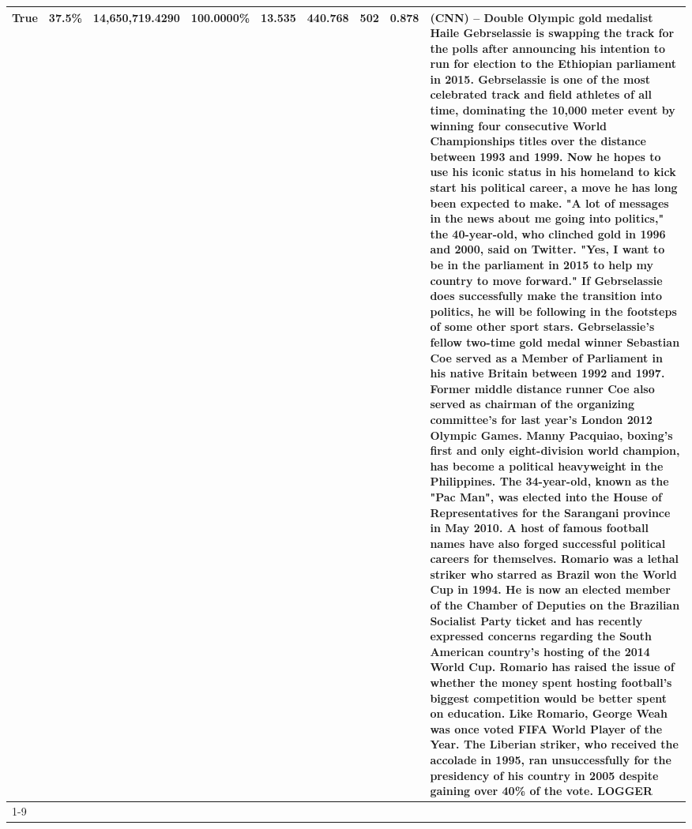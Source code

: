 \begin{table}[H]
{\begin{tabular}{lllrlllll}
True & 37.5\% & 14,650,719.4290 & \bfseries \color{red} 100.0000\% & 13.535 & 440.768 & 502 & 0.878 & (CNN) -- Double Olympic gold medalist Haile Gebrselassie is swapping the track for the polls after announcing his intention to run for election to the Ethiopian parliament in 2015. Gebrselassie is one of the most celebrated track and field athletes of all time, dominating the 10,000 meter event by winning four consecutive World Championships titles over the distance between 1993 and 1999. Now he hopes to use his iconic status in his homeland to kick start his political career, a move he has long been expected to make. "A lot of messages in the news about me going into politics," the 40-year-old, who clinched gold in 1996 and 2000, said on Twitter. "Yes, I want to be in the parliament in 2015 to help my country to move forward." If Gebrselassie does successfully make the transition into politics, he will be following in the footsteps of some other sport stars. Gebrselassie's fellow two-time gold medal winner Sebastian Coe served as a Member of Parliament in his native Britain between 1992 and 1997. Former middle distance runner Coe also served as chairman of the organizing committee's for last year's London 2012 Olympic Games. Manny Pacquiao, boxing's first and only eight-division world champion, has become a political heavyweight in the Philippines. The 34-year-old, known as the "Pac Man", was elected into the House of Representatives for the Sarangani province in May 2010. A host of famous football names have also forged successful political careers for themselves. Romario was a lethal striker who starred as Brazil won the World Cup in 1994. He is now an elected member of the Chamber of Deputies on the Brazilian Socialist Party ticket and has recently expressed concerns regarding the South American country's hosting of the 2014 World Cup. Romario has raised the issue of whether the money spent hosting football's biggest competition would be better spent on education. Like Romario, George Weah was once voted FIFA World Player of the Year. The Liberian striker, who received the accolade in 1995, ran unsuccessfully for the presidency of his country in 2005 despite gaining over 40\% of the vote. LOGGER \\
\cline{1-9}

\end{tabular}}
\end{table}
